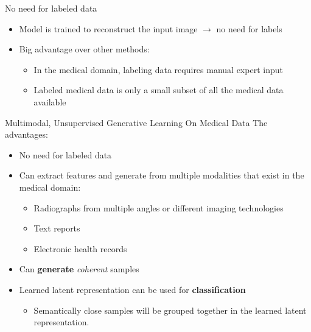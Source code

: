 \documentclass[aspectratio=169]{beamer}
\begin{document}
    \begin{frame}{No need for labeled data}
        \begin{itemize}
            \item Model is trained to reconstruct the input image $\rightarrow$ no need for labels
            \item Big advantage over other methods:
            \begin{itemize}
                \item In the medical domain, labeling data requires manual expert input
                \item Labeled medical data is only a small subset of all the medical data available
            \end{itemize}
        \end{itemize}
    \end{frame}



    \begin{frame}{Multimodal, Unsupervised Generative Learning On Medical Data}
        \large{The advantages:}
        \begin{itemize}
            \item No need for labeled data
            \item Can extract features and generate from multiple modalities that exist in the medical domain:
            \pause
            \begin{itemize}
                \item Radiographs from multiple angles or different imaging technologies
                \item Text reports
                \item Electronic health records
            \end{itemize}
            \pause
            \item Can \textbf{generate} \textit{coherent} samples
            \pause
            \item Learned latent representation can be used for \textbf{classification}
            \begin{itemize}
                \item Semantically close samples will be grouped together in the learned latent representation.
            \end{itemize}
        \end{itemize}
    \end{frame}
\end{document}
